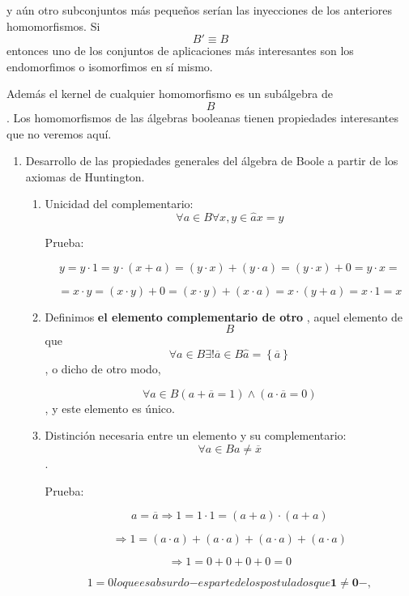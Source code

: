 \documentclass[
]{article}
\begin{document}
\begin{enumerate}
  y aún otro subconjuntos más pequeños serían las inyecciones de los
  anteriores homomorfismos. Si \[{B'} \equiv B\]entonces uno de los
  conjuntos de aplicaciones más interesantes son los endomorfimos o
  isomorfimos en sí mismo.

  Además el kernel de cualquier homomorfismo es un subálgebra de \[B\].
  Los homomorfismos de las álgebras booleanas tienen propiedades
  interesantes que no veremos aquí.

  \begin{enumerate}
  \def\labelenumii{\arabic{enumii}.}
  \setcounter{enumii}{3}
  \item
    Desarrollo de las propiedades generales del álgebra de Boole a
    partir de los axiomas de Huntington.

    \begin{enumerate}
    \def\labelenumiii{\arabic{enumiii}.}
    \item
      Unicidad del
      complementario:\[{\forall{a \in B}\forall x,{y \in \widehat{a}}}{x = y}\]

      Prueba:

      \[y{{{{{{= {y \cdot 1}} = {y \cdot {({x + a})}}} = {{({y \cdot x})} + {({y \cdot a})}}} = {{({y \cdot x})} + 0}} = {y \cdot x}} =}\]

      \[{{{{{= {x \cdot y}} = {{({x \cdot y})} + 0}} = {{({x \cdot y})} + {({x \cdot a})}}} = {x \cdot {({y + a})}}} = {x \cdot 1}} = x\]
    \item
      Definimos \textbf{el elemento complementario de otro} , aquel
      elemento de \[B\]
      que\[\forall{a \in B}\exists!{\overline{a} \in B}{\widehat{a} = \left\{ \overline{a} \right\}}\],
      o dicho de otro modo,

      \[\forall{a \in B}{\left( {{a + \overline{a}} = 1} \right) \land \left( {{a \cdot \overline{a}} = 0} \right)}\],
      y este elemento es único.
    \item
      Distinción necesaria entre un elemento y su complementario:
      \[\forall{a \in B}{a \neq \overline{x}}\].

      Prueba:

      \[{a = \overline{a}}\Rightarrow{{1 = {1 \cdot 1}} = {{({a + a})} \cdot {({a + a})}}}\]

      \[\Rightarrow{1 = {{{{({a \cdot a})} + {({a \cdot a})}} + {({a \cdot a})}} + {({a \cdot a})}}}\]

      \[\Rightarrow{{1 = {{{0 + 0} + 0} + 0}} = 0}\]

      \[{1 = 0}\mathit{lo}\mathit{que}\mathit{es}\mathit{absurdo}{- \mathit{es}}\mathit{parte}\mathit{de}\mathit{los}\mathit{postulados}\mathit{que}{\mathbf{1} \neq {\mathbf{0} - ,}}\]


\end{enumerate}
\end{enumerate}
\end{enumerate}
\end{document}

